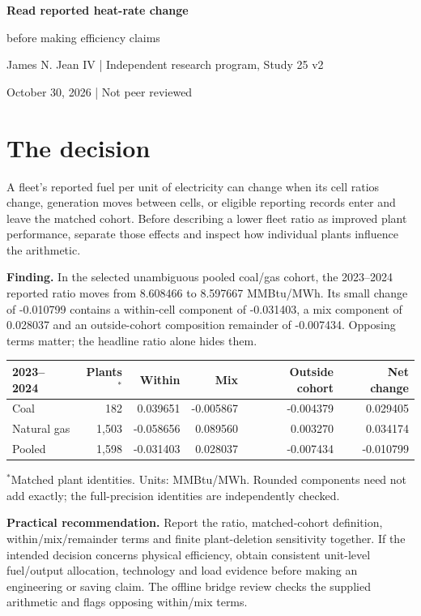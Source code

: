 \documentclass[11pt]{article}
\newcommand{\CoalPlants}{182}
\newcommand{\CoalWithin}{0.039651}
\newcommand{\CoalMix}{-0.005867}
\newcommand{\CoalOutside}{-0.004379}
\newcommand{\CoalChange}{0.029405}
\newcommand{\GasPlants}{1,503}
\newcommand{\GasWithin}{-0.058656}
\newcommand{\GasMix}{0.089560}
\newcommand{\GasOutside}{0.003270}
\newcommand{\GasChange}{0.034174}
\newcommand{\PooledPlants}{1,598}
\newcommand{\PooledWithin}{-0.031403}
\newcommand{\PooledMix}{0.028037}
\newcommand{\PooledOutside}{-0.007434}
\newcommand{\PooledChange}{-0.010799}
\newcommand{\PooledStart}{8.608466}
\newcommand{\PooledEnd}{8.597667}
\begin{document}
\begin{center}{\LARGE\bfseries Read reported heat-rate change\par before making efficiency claims}\par
\vspace{5pt}{\large Within-cell ratios, generation shares and cohort composition}\par
James N. Jean IV \quad | \quad Independent research program, Study 25 v2\par
October 30, 2026 \quad | \quad Not peer reviewed
\end{center}
\section*{The decision}
A fleet's reported fuel per unit of electricity can change when its cell ratios change, generation moves between cells, or eligible reporting records enter and leave the matched cohort. Before describing a lower fleet ratio as improved plant performance, separate those effects and inspect how individual plants influence the arithmetic.

\textbf{Finding.} In the selected unambiguous pooled coal/gas cohort, the 2023--2024 reported ratio moves from \PooledStart{} to \PooledEnd{} MMBtu/MWh. Its small change of \PooledChange{} contains a within-cell component of \PooledWithin{}, a mix component of \PooledMix{} and an outside-cohort composition remainder of \PooledOutside{}. Opposing terms matter; the headline ratio alone hides them.

\begin{center}\small\begin{tabular}{lrrrrr}\toprule
2023--2024 & Plants$^*$ & Within & Mix & Outside cohort & Net change\\\midrule
Coal & \CoalPlants{} & \CoalWithin{} & \CoalMix{} & \CoalOutside{} & \CoalChange{} \\
Natural gas & \GasPlants{} & \GasWithin{} & \GasMix{} & \GasOutside{} & \GasChange{} \\
Pooled & \PooledPlants{} & \PooledWithin{} & \PooledMix{} & \PooledOutside{} & \PooledChange{} \\
\bottomrule\end{tabular}\end{center}
\smallskip $^*$Matched plant identities. Units: MMBtu/MWh. Rounded components need not add exactly; the full-precision identities are independently checked.

\textbf{Practical recommendation.} Report the ratio, matched-cohort definition, within/mix/remainder terms and finite plant-deletion sensitivity together. If the intended decision concerns physical efficiency, obtain consistent unit-level fuel/output allocation, technology and load evidence before making an engineering or saving claim. The offline bridge review checks the supplied arithmetic and flags opposing within/mix terms.
\end{document}
